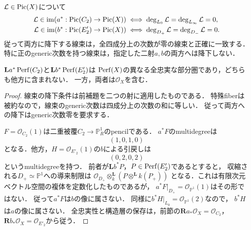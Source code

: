 \begin{proposition}[二つの降下条件とPerfの像]
\label{prop:qa-boundary-two-descent-images}
$\mathcal L\in\operatorname{Pic}(X)$について
\[
 \begin{split}
 \mathcal L\in\operatorname{im}(a^*:\operatorname{Pic}(C_2)\to\operatorname{Pic}(X))
 &\iff\deg_{L_0}\mathcal L=\deg_{L_\infty}\mathcal L=0,\\
 \mathcal L\in\operatorname{im}(b^*:\operatorname{Pic}(E'_2)\to\operatorname{Pic}(X))
 &\iff\deg_{D_+}\mathcal L=\deg_{D_-}\mathcal L=0.
 \end{split}
\]
従って両方に降下する線束は，全四成分上の次数が零の線束と正確に一致する．
特に正のgeneric次数を持つ線束は，指定した二射$a,b$の両方へは降下しない．

$\mathbf La^*\operatorname{Perf}(C_2)$と$\mathbf Lb^*\operatorname{Perf}(E'_2)$は
$\operatorname{Perf}(X)$の異なる全忠実な部分圏であり，どちらも他方に含まれない．
一方，両者は$\mathcal O_X$を含む．
\end{proposition}
\begin{proof}
線束の降下条件は前補題を二つの射に適用したものである．
特殊fiberは被約なので，線束のgeneric次数は四成分上の次数の和に等しい．
従って両方への降下はgeneric次数零を要求する．

$F=\mathcal O_{C_2}(1)$は二重被覆$C_2\to\mathbb P^1_R$のpencilである．
$a^*F$のmultidegreeは
\[
                 (1,0,1,0)
\]
となる．他方，$H=\mathcal O_{E'_2}(1)$の$b$による引戻しは
\[
                 (0,2,0,2)
\]
というmultidegreeを持つ．
前者が$\mathbf Lb^*P$，$P\in\operatorname{Perf}(E'_2)$であるとすると，
収縮される$D_+\simeq\mathbb P^1$への導来制限は
$\mathcal O_{D_+}\otimes_k^{\mathbf L}(P\otimes^{\mathbf L}k(P_+))$
となる．これは有限次元ベクトル空間の複体を定数化したものであるが，
$a^*F|_{D_+}=\mathcal O_{\mathbb P^1}(1)$はその形ではない．
従って$a^*F$は$b$の像に属さない．
同様に$b^*H|_{L_0}=\mathcal O_{\mathbb P^1}(2)$なので，
$b^*H$は$a$の像に属さない．
全忠実性と構造層の保存は，前節の$\mathbf Ra_*\mathcal O_X=\mathcal O_{C_2}$，
$\mathbf Rb_*\mathcal O_X=\mathcal O_{E'_2}$から従う．
\end{proof}

